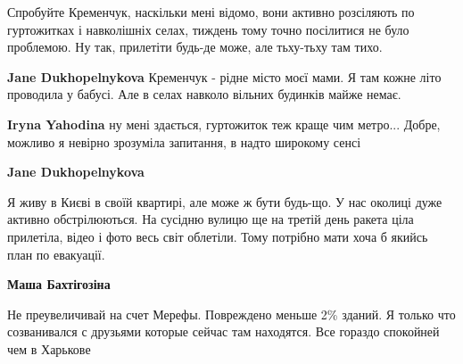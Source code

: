 \begin{itemize}
\begin{itemize}
Спробуйте Кременчук, наскільки мені відомо, вони активно розсіляють по
гуртожитках і навколішніх селах, тиждень тому точно посілитися не було
проблемою. Ну так, прилетіти будь-де може, але тьху-тьху там тихо.

\textbf{Jane Dukhopelnykova} Кременчук - рідне місто моєї мами. Я там кожне літо проводила у бабусі. Але в селах навколо вільних будинків майже немає.

\textbf{Iryna Yahodina} ну мені здається, гуртожиток теж краще чим метро... Добре, можливо я невірно зрозуміла запитання, в надто широкому сенсі

\textbf{Jane Dukhopelnykova} 

Я живу в Києві в своїй квартирі, але може ж бути будь-що. У нас околиці дуже
активно обстрілюються. На сусідню вулицю ще на третій день ракета ціла
прилетіла, відео і фото весь світ облетіли. Тому потрібно мати хоча б якийсь
план по евакуації.

\textbf{Маша Бахтігозіна} 

Не преувеличивай на счет Мерефы. Повреждено меньше 2\% зданий. Я только что
созванивался с друзьями которые сейчас там находятся. Все гораздо спокойней чем
в Харькове

\end{itemize} %


\end{itemize} %
